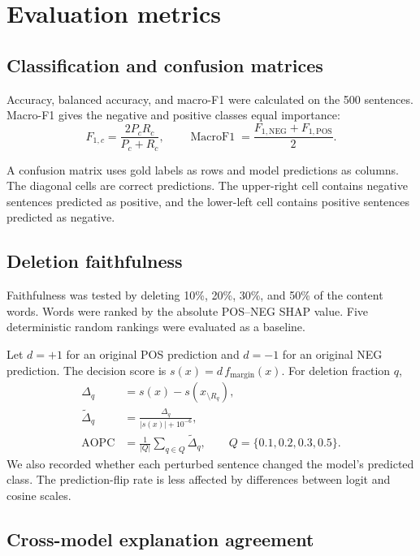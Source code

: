 \documentclass[11pt,a4paper]{article}
\begin{document}
\section{Evaluation metrics}

\subsection{Classification and confusion matrices}

Accuracy, balanced accuracy, and macro-F1 were calculated on the 500 sentences. Macro-F1 gives the negative and positive classes equal importance:
\begin{equation}
  F_{1,c}=\frac{2P_cR_c}{P_c+R_c},
  \qquad
  \operatorname{MacroF1}=\frac{F_{1,\mathrm{NEG}}+F_{1,\mathrm{POS}}}{2}.
\end{equation}

A confusion matrix uses gold labels as rows and model predictions as columns. The diagonal cells are correct predictions. The upper-right cell contains negative sentences predicted as positive, and the lower-left cell contains positive sentences predicted as negative.

\subsection{Deletion faithfulness}

Faithfulness was tested by deleting 10\%, 20\%, 30\%, and 50\% of the content words. Words were ranked by the absolute POS--NEG SHAP value. Five deterministic random rankings were evaluated as a baseline.

Let $d=+1$ for an original POS prediction and $d=-1$ for an original NEG prediction. The decision score is $s(x)=d\,f_{\mathrm{margin}}(x)$. For deletion fraction $q$,
\begin{align}
  \Delta_q &= s(x)-s(x_{\setminus R_q}),\\
  \widetilde{\Delta}_q &= \frac{\Delta_q}{|s(x)|+10^{-6}},\\
  \operatorname{AOPC} &= \frac{1}{|Q|}\sum_{q\in Q}\widetilde{\Delta}_q,
  \qquad Q=\{0.1,0.2,0.3,0.5\}.
\end{align}
We also recorded whether each perturbed sentence changed the model's predicted class. The prediction-flip rate is less affected by differences between logit and cosine scales.

\subsection{Cross-model explanation agreement}
\end{document}

